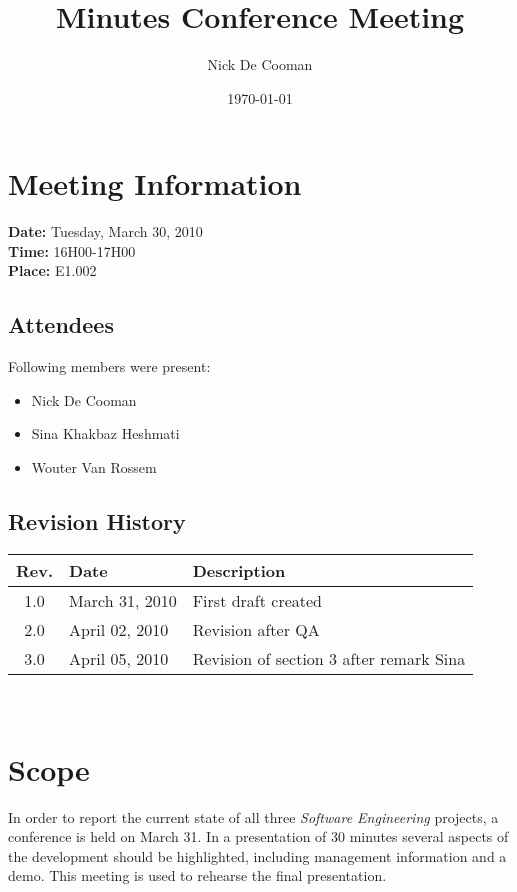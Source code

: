 \documentclass[a4paper, 12pt]{article}
\begin{document}
\title{Minutes Conference Meeting}
\author{Nick De Cooman}
\date{\today}

\maketitle	
	\section{Meeting Information}
		\textbf{Date:} Tuesday, March 30, 2010\\
		\textbf{Time:} 16H00-17H00\\
		\textbf{Place:} E1.002
		
		\subsection{Attendees}
Following members were present:
			\begin{itemize}
				\item Nick De Cooman
				\item Sina Khakbaz Heshmati
				\item Wouter Van Rossem
			\end{itemize}
			
		\subsection{Revision History}
			\begin{tabular}{c | l | l }
				\textbf{Rev.} & \textbf{Date} & \textbf{Description} \\
				\hline
				1.0 & March 31, 2010 & First draft created \\
				2.0 & April 02, 2010 & Revision after QA \\
				3.0 & April 05, 2010 & Revision of section 3 after remark Sina

			\end{tabular}	
			\\	

\section{Scope}

In order to report the current state of all three \emph{Software Engineering} projects, a conference is held on March 31. In a presentation of 30 minutes several aspects of the development should be highlighted, including management information and a demo. This meeting is used to rehearse the final presentation. 
\end{document}
